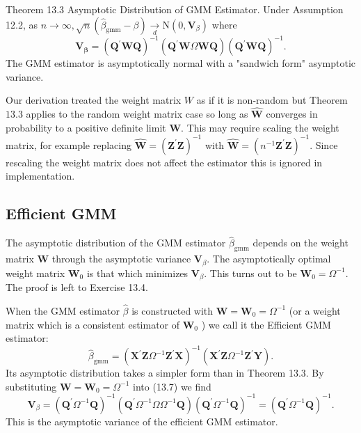 \documentclass[10pt]{article}
\begin{document}
Theorem 13.3 Asymptotic Distribution of GMM Estimator. Under Assumption 12.2, as $n \rightarrow \infty, \sqrt{n}\left(\widehat{\beta}_{\mathrm{gmm}}-\beta\right) \underset{d}{\longrightarrow} \mathrm{N}\left(0, \boldsymbol{V}_{\beta}\right)$ where
$$
\boldsymbol{V}_{\boldsymbol{\beta}}=\left(\boldsymbol{Q}^{\prime} \boldsymbol{W} \boldsymbol{Q}\right)^{-1}\left(\boldsymbol{Q}^{\prime} \boldsymbol{W} \Omega \boldsymbol{W} \boldsymbol{Q}\right)\left(\boldsymbol{Q}^{\prime} \boldsymbol{W} \boldsymbol{Q}\right)^{-1} .
$$
The GMM estimator is asymptotically normal with a "sandwich form" asymptotic variance.

Our derivation treated the weight matrix $W$ as if it is non-random but Theorem $13.3$ applies to the random weight matrix case so long as $\widehat{\boldsymbol{W}}$ converges in probability to a positive definite limit $\boldsymbol{W}$. This may require scaling the weight matrix, for example replacing $\widehat{\boldsymbol{W}}=\left(\boldsymbol{Z}^{\prime} \boldsymbol{Z}\right)^{-1}$ with $\widehat{\boldsymbol{W}}=\left(n^{-1} \boldsymbol{Z}^{\prime} \boldsymbol{Z}\right)^{-1}$. Since rescaling the weight matrix does not affect the estimator this is ignored in implementation.

\subsection{Efficient GMM}
The asymptotic distribution of the GMM estimator $\widehat{\beta}_{\mathrm{gmm}}$ depends on the weight matrix $\boldsymbol{W}$ through the asymptotic variance $\boldsymbol{V}_{\beta}$. The asymptotically optimal weight matrix $\boldsymbol{W}_{0}$ is that which minimizes $\boldsymbol{V}_{\beta}$. This turns out to be $\boldsymbol{W}_{0}=\Omega^{-1}$. The proof is left to Exercise 13.4.

When the GMM estimator $\widehat{\beta}$ is constructed with $\boldsymbol{W}=\boldsymbol{W}_{0}=\Omega^{-1}$ (or a weight matrix which is a consistent estimator of $\boldsymbol{W}_{0}$ ) we call it the Efficient GMM estimator:
$$
\widehat{\beta}_{\mathrm{gmm}}=\left(\boldsymbol{X}^{\prime} \boldsymbol{Z} \Omega^{-1} \boldsymbol{Z}^{\prime} \boldsymbol{X}\right)^{-1}\left(\boldsymbol{X}^{\prime} \boldsymbol{Z} \Omega^{-1} \boldsymbol{Z}^{\prime} \boldsymbol{Y}\right) .
$$
Its asymptotic distribution takes a simpler form than in Theorem 13.3. By substituting $\boldsymbol{W}=\boldsymbol{W}_{0}=\Omega^{-1}$ into (13.7) we find
$$
\boldsymbol{V}_{\beta}=\left(\boldsymbol{Q}^{\prime} \Omega^{-1} \boldsymbol{Q}\right)^{-1}\left(\boldsymbol{Q}^{\prime} \Omega^{-1} \Omega \Omega^{-1} \boldsymbol{Q}\right)\left(\boldsymbol{Q}^{\prime} \Omega^{-1} \boldsymbol{Q}\right)^{-1}=\left(\boldsymbol{Q}^{\prime} \Omega^{-1} \boldsymbol{Q}\right)^{-1} .
$$
This is the asymptotic variance of the efficient GMM estimator.
\end{document}
